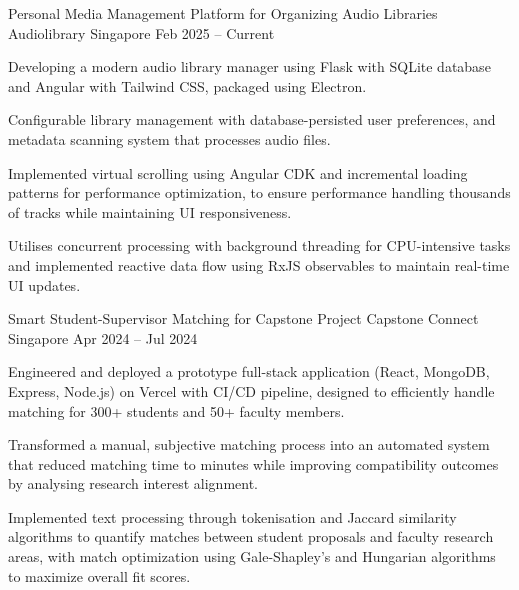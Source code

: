 

\begin{cventries}
    \cventry
    {Personal Media Management Platform for Organizing Audio Libraries} %
    {Audiolibrary} %
    {Singapore} %
    {Feb 2025 – Current} %
    {
        \begin{cvitems} %
            \item {Developing a modern audio library manager using Flask with SQLite database and Angular with Tailwind CSS, packaged using Electron.}
            \item {Configurable library management with database-persisted user preferences, and metadata scanning system that processes audio files.}
            \item {Implemented virtual scrolling using Angular CDK and incremental loading patterns for performance optimization, to ensure performance handling thousands of tracks while maintaining UI responsiveness.}
            \item {Utilises concurrent processing with background threading for CPU-intensive tasks and implemented reactive data flow using RxJS observables to maintain real-time UI updates.}
            \vspace{3mm}
        \end{cvitems}
    }

    \cventry
    {Smart Student-Supervisor Matching for Capstone Project} %
    {Capstone Connect} %
    {Singapore} %
    {Apr 2024 – Jul 2024} %
    {
        \begin{cvitems} %
            \item {Engineered and deployed a prototype full-stack application (React, MongoDB, Express, Node.js) on Vercel with CI/CD pipeline, designed to efficiently handle matching for 300+ students and 50+ faculty members.}
            \item {Transformed a manual, subjective matching process into an automated system that reduced matching time to minutes while improving compatibility outcomes by analysing research interest alignment.}
            \item {Implemented text processing through tokenisation and Jaccard similarity algorithms to quantify matches between student proposals and faculty research areas, with match optimization using Gale-Shapley's and Hungarian algorithms to maximize overall fit scores.}
            \vspace{3mm}
        \end{cvitems}
    }


\end{cventries}
